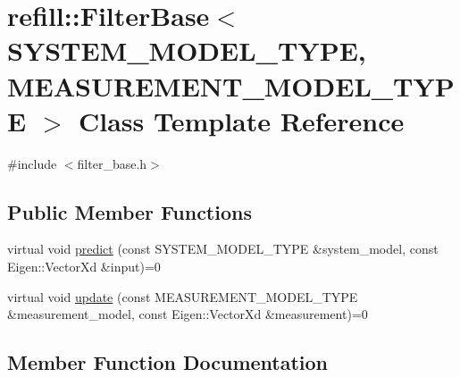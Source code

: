 \hypertarget{classrefill_1_1FilterBase}{}\section{refill\+:\+:Filter\+Base$<$ S\+Y\+S\+T\+E\+M\+\_\+\+M\+O\+D\+E\+L\+\_\+\+T\+Y\+PE, M\+E\+A\+S\+U\+R\+E\+M\+E\+N\+T\+\_\+\+M\+O\+D\+E\+L\+\_\+\+T\+Y\+PE $>$ Class Template Reference}
\label{classrefill_1_1FilterBase}


{\ttfamily \#include $<$filter\+\_\+base.\+h$>$}

\subsection*{Public Member Functions}
\begin{DoxyCompactItemize}
\item 
virtual void \hyperlink{classrefill_1_1FilterBase_aebd38bc87b2614e9f9f71b0cab2f74b8}{predict} (const S\+Y\+S\+T\+E\+M\+\_\+\+M\+O\+D\+E\+L\+\_\+\+T\+Y\+PE \&system\+\_\+model, const Eigen\+::\+Vector\+Xd \&input)=0
\item 
virtual void \hyperlink{classrefill_1_1FilterBase_a1f163ae39c87c5816799ef1a84714613}{update} (const M\+E\+A\+S\+U\+R\+E\+M\+E\+N\+T\+\_\+\+M\+O\+D\+E\+L\+\_\+\+T\+Y\+PE \&measurement\+\_\+model, const Eigen\+::\+Vector\+Xd \&measurement)=0
\end{DoxyCompactItemize}


\subsection{Member Function Documentation}
